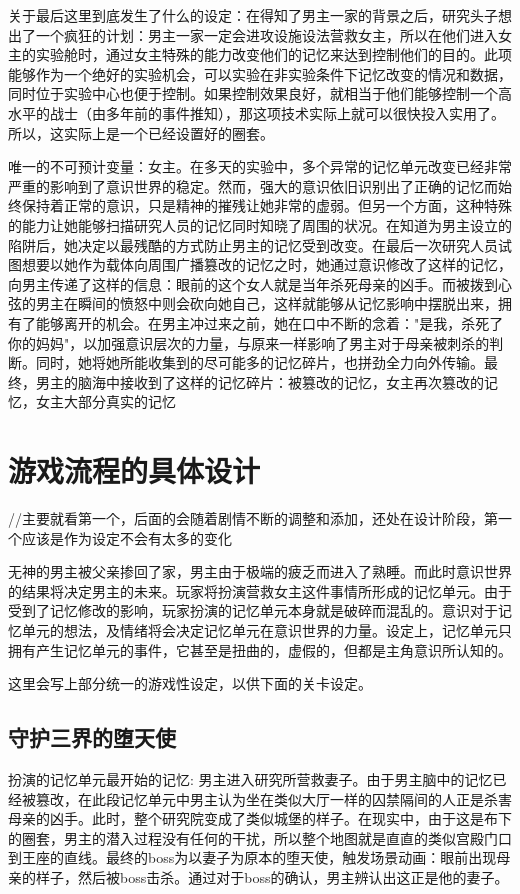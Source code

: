 \documentclass[12pt, a4paper]{article}
\begin{document}
    \medskip

    关于最后这里到底发生了什么的设定：在得知了男主一家的背景之后，研究头子想出了一个疯狂的计划：男主一家一定会进攻设施设法营救女主，所以在他们进入女主的实验舱时，通过女主特殊的能力改变他们的记忆来达到控制他们的目的。此项能够作为一个绝好的实验机会，可以实验在非实验条件下记忆改变的情况和数据，同时位于实验中心也便于控制。如果控制效果良好，就相当于他们能够控制一个高水平的战士（由多年前的事件推知），那这项技术实际上就可以很快投入实用了。所以，这实际上是一个已经设置好的圈套。

    唯一的不可预计变量：女主。在多天的实验中，多个异常的记忆单元改变已经非常严重的影响到了意识世界的稳定。然而，强大的意识依旧识别出了正确的记忆而始终保持着正常的意识，只是精神的摧残让她非常的虚弱。但另一个方面，这种特殊的能力让她能够扫描研究人员的记忆同时知晓了周围的状况。在知道为男主设立的陷阱后，她决定以最残酷的方式防止男主的记忆受到改变。在最后一次研究人员试图想要以她作为载体向周围广播篡改的记忆之时，她通过意识修改了这样的记忆，向男主传递了这样的信息：眼前的这个女人就是当年杀死母亲的凶手。而被拨到心弦的男主在瞬间的愤怒中则会砍向她自己，这样就能够从记忆影响中摆脱出来，拥有了能够离开的机会。在男主冲过来之前，她在口中不断的念着："是我，杀死了你的妈妈"，以加强意识层次的力量，与原来一样影响了男主对于母亲被刺杀的判断。同时，她将她所能收集到的尽可能多的记忆碎片，也拼劲全力向外传输。最终，男主的脑海中接收到了这样的记忆碎片：被篡改的记忆，女主再次篡改的记忆，女主大部分真实的记忆

    \newpage 
    \section*{游戏流程的具体设计}

    //主要就看第一个，后面的会随着剧情不断的调整和添加，还处在设计阶段，第一个应该是作为设定不会有太多的变化

    无神的男主被父亲掺回了家，男主由于极端的疲乏而进入了熟睡。而此时意识世界的结果将决定男主的未来。玩家将扮演营救女主这件事情所形成的记忆单元。由于受到了记忆修改的影响，玩家扮演的记忆单元本身就是破碎而混乱的。意识对于记忆单元的想法，及情绪将会决定记忆单元在意识世界的力量。设定上，记忆单元只拥有产生记忆单元的事件，它甚至是扭曲的，虚假的，但都是主角意识所认知的。

    这里会写上部分统一的游戏性设定，以供下面的关卡设定。

    \subsection*{守护三界的堕天使}
            扮演的记忆单元最开始的记忆: 男主进入研究所营救妻子。由于男主脑中的记忆已经被篡改，在此段记忆单元中男主认为坐在类似大厅一样的囚禁隔间的人正是杀害母亲的凶手。此时，整个研究院变成了类似城堡的样子。在现实中，由于这是布下的圈套，男主的潜入过程没有任何的干扰，所以整个地图就是直直的类似宫殿门口到王座的直线。最终的boss为以妻子为原本的堕天使，触发场景动画：眼前出现母亲的样子，然后被boss击杀。通过对于boss的确认，男主辨认出这正是他的妻子。
\end{document}
